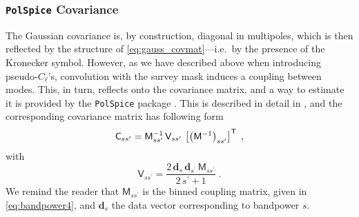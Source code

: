 \documentclass[astrosymb,twocolumn]{aastex631}
\newcommand{\bs}{\ensuremath{b\sigma_8}}
\renewcommand{\fs}{\ensuremath{f\!\sigma_8}}
\begin{document}

\subsubsection{\texttt{PolSpice} Covariance}
\label{subsec:Pol}
The Gaussian covariance is, by construction, diagonal in multipoles, which is then reflected by the structure of \autoref{eq:gauss_covmat}---i.e.\ by the presence of the Kronecker symbol. However, as we have described above when introducing pseudo-$C_\ell$'s, convolution with the survey mask induces a coupling between modes. This, in turn, reflects onto the covariance matrix, and a way to estimate it is provided by the \texttt{PolSpice} package \citep{Chon2004}. This is described in detail in \citet{Efstathiou2004}, and the corresponding covariance matrix has following form
\begin{equation}
{\mathsf C}_{ss^\prime}=\mathsf M_{ss^\prime}^{-1}\,{\mathsf V}_{ss^\prime}\,\left[\left(\mathsf M^{-1}\right)_{ss^\prime}\right]^{\sf T}\;,
    \label{eq:pol_covmat}
\end{equation}
with
\begin{equation}
{\mathsf V}_{ss^\prime}=\frac{2\,\bm d_s\, \bm d_{s^\prime}\,\mathsf M_{ss^\prime}}{2\,s^\prime+1}\;.
    \label{eq:V_mat}
\end{equation}
We remind the reader that \(\mathsf M_{ss^\prime}\) is the binned coupling matrix, given in \autoref{eq:bandpower4}, and $\bm d_s$ the data vector corresponding to bandpower \(s\).
\end{document}

